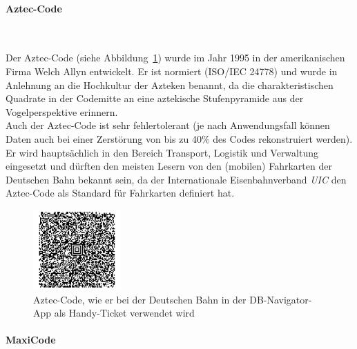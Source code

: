 \paragraph{Aztec-Code}~

Der Aztec-Code (siehe Abbildung~\ref{fig:aztec}) wurde im Jahr 1995 in der amerikanischen Firma Welch Allyn entwickelt.
Er ist normiert (ISO/IEC 24778) und wurde in Anlehnung an die Hochkultur der Azteken benannt, 
da die charakteristischen Quadrate in der Codemitte an eine aztekische Stufenpyramide aus der Vogelperspektive erinnern.\\ 
Auch der Aztec-Code ist sehr fehlertolerant (je nach Anwendungsfall können Daten auch bei einer Zerstörung von bis zu 40\% des Codes rekonstruiert werden). Er wird hauptsächlich in den Bereich Transport, Logistik und Verwaltung eingesetzt und dürften den meisten Lesern von den (mobilen) Fahrkarten der Deutschen Bahn bekannt sein, da der Internationale Eisenbahnverband \textit{UIC} den Aztec-Code als Standard für Fahrkarten definiert hat.\\

\begin{figure}[htbp]%
	\centering
	\includegraphics[width=0.3\textwidth]{Bilder/Aztec_Code.png} 
	\vspace{-0.2cm}
	\caption[Aztec-Code]{Aztec-Code, wie er bei der Deutschen Bahn in der DB-Navigator-App als Handy-Ticket verwendet wird\footnotemark}
	\label{fig:aztec}	
\end{figure}
\pagebreak


\paragraph{MaxiCode}~

